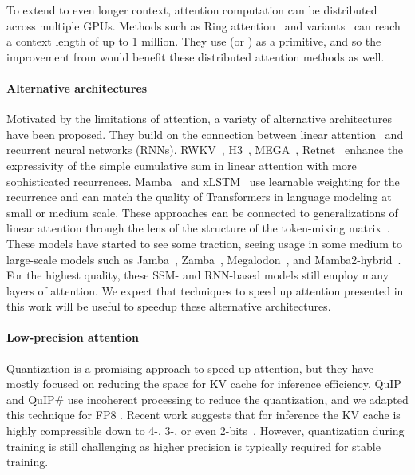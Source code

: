 To extend to even longer context, attention computation can be distributed
across multiple GPUs.
Methods such as Ring attention~\citep{liu2023ring,liu2024world} and
variants~\citep{brandon2023striped} can reach a context length of up to 1
million.
They use \fa (or \faa) as a primitive, and so the improvement from \fat would
benefit these distributed attention methods as well.

\paragraph{Alternative architectures}
Motivated by the limitations of attention, a variety of alternative
architectures have been proposed.
They build on the connection between linear
attention~\citep{katharopoulos2020transformers} and recurrent neural networks
(RNNs).
RWKV~\citep{peng2023rwkv}, H3~\citep{dao2023hungry}, MEGA~\citep{ma2023mega},
Retnet~\citep{sun2023retentive}  enhance the expressivity of the simple
cumulative sum in linear attention with more sophisticated recurrences.
Mamba~\citep{gu2023mamba} and xLSTM~\citep{beck2024xlstm} use learnable
weighting for the recurrence and can match the quality of Transformers in
language modeling at small or medium scale.
These approaches can be connected to generalizations of linear attention through
the lens of the structure of the token-mixing matrix~\citep{dao2024transformers}.
These models have started to see some traction, seeing usage in some medium to
large-scale models such as Jamba~\citep{jamba}, Zamba~\citep{zamba},
Megalodon~\citep{ma2024megalodon}, and Mamba2-hybrid~\citep{waleffe2024empirical}.
For the highest quality, these SSM- and RNN-based models still employ
many layers of attention.
We expect that techniques to speed up attention presented in this work will be
useful to speedup these alternative architectures.

\paragraph{Low-precision attention}
Quantization is a promising approach to speed up attention, but they have mostly
focused on reducing the space for KV cache for inference efficiency.
QuIP~\citep{chee2024quip} and QuIP\#\citep{tseng2024quip} use incoherent processing to reduce the quantization,
and we adapted this technique for FP8 \fat.
Recent work suggests that for inference the KV cache is highly compressible down to 4-, 3-, or
even 2-bits~\citep{hooper2024kvquant, liu2024kivi}.
However, quantization during training is still challenging as higher precision
is typically required for stable training.

